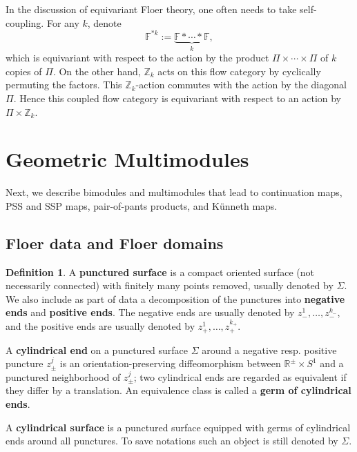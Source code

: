 \documentclass[reqno, 10pt]{amsart}
\numberwithin{equation}{section}
\numberwithin{equation}{section}
\theoremstyle{definition}
\newtheorem{defn}[thm]{Definition}
\theoremstyle{remark}
\newcommand{\beqn}{\begin{equation*}}
\newcommand{\eeqn}{\end{equation*}}
\newcommand{\mb}{\mathbb}
\begin{document}
In the discussion of equivariant Floer theory, one often needs to take self-coupling. For any $k$, denote
\beqn
{\mb F}^{\ast k}:= \underbrace{ {\mb F} \ast \cdots \ast {\mb F}}_{k},
\eeqn
which is equivariant with respect to the action by the product $\Pi \times \cdots \times \Pi$ of $k$ copies of $\Pi$. On the other hand, ${\mb Z}_k$ acts on this flow category by cyclically permuting the factors. This ${\mb Z}_k$-action commutes with the action by the diagonal $\Pi$. Hence this coupled flow category is equivariant with respect to an action by $\Pi \times {\mb Z}_k$.


\section{Geometric Multimodules}

Next, we describe bimodules and multimodules that lead to continuation maps, PSS and SSP maps, pair-of-pants products, and K\"unneth maps.



\subsection{Floer data and Floer domains}

\begin{defn}\label{defn_admissible_domain}
A {\bf punctured surface} is a compact oriented surface  (not necessarily connected) with finitely many points removed, usually denoted by $\Sigma$. We also include as part of data a decomposition of the punctures into {\bf negative ends} and {\bf positive ends}. The negative ends are usually denoted by $z_-^1, \ldots, z_-^{k_-}$, and the positive ends are usually denoted by $z_+^1, \ldots, z_+^{k_+}$. 

A {\bf cylindrical end} on a punctured surface $\Sigma$ around a negative resp. positive puncture $z_\pm^j$ is an orientation-preserving diffeomorphism between ${\mb R}^\pm \times S^1$ and a punctured neighborhood of $z_\pm^j$; two cylindrical ends are regarded as equivalent if they differ by a translation. An equivalence class is called a {\bf germ of cylindrical ends}.

A {\bf cylindrical surface} is a punctured  surface equipped with germs of cylindrical ends around all punctures. To save notations such an object is still denoted by $\Sigma$.
\end{defn}
\end{document}
